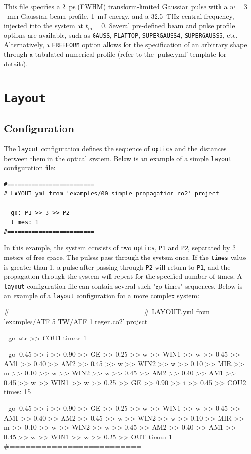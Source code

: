 This file specifies a 2~ps (FWHM) transform-limited Gaussian pulse with a $w=3$~mm Gaussian beam profile, 1~mJ energy, and a 32.5~THz central frequency, injected into the system at $t_{\text{in}}=0$. Several pre-defined beam and pulse profile options are available, such as \texttt{GAUSS}, \texttt{FLATTOP}, \texttt{SUPERGAUSS4}, \texttt{SUPERGAUSS6}, etc. Alternatively, a \texttt{FREEFORM} option allows for the specification of an arbitrary shape through a tabulated numerical profile (refer to the 'pulse.yml' template for details).


\section{\texttt{Layout}}
\subsection{Configuration}
The \texttt{layout} configuration defines the sequence of \texttt{optics} and the distances between them in the optical system. Below is an example of a simple \texttt{layout} configuration file:

\begin{verbatim}
#=========================
# LAYOUT.yml from 'examples/00 simple propagation.co2' project

- go: P1 >> 3 >> P2
  times: 1
#=========================
\end{verbatim}

In this example, the system consists of two \texttt{optics}, \texttt{P1} and \texttt{P2}, separated by 3 meters of free space. The pulses pass through the system once. If the \texttt{times} value is greater than 1, a pulse after passing through \texttt{P2} will return to \texttt{P1}, and the propagation through the system will repeat for the specified number of times. A \texttt{layout} configuration file can contain several such "go-times" sequences. Below is an example of a \texttt{layout} configuration for a more complex system:

\begin{spverbatim}
#=========================
# LAYOUT.yml from 'examples/ATF 5 TW/ATF 1 regen.co2' project

- go: str >> COU1
  times: 1

- go: 0.45 >> i >> 0.90 >> GE >> 0.25 >> w >> WIN1 >> w >> 0.45 >> AM1 >> 0.40 >> AM2 >> 0.45 >> w >> WIN2 >> w >> 0.10 >> MIR >> m >> 0.10 >> w >> WIN2 >> w >> 0.45 >> AM2 >> 0.40 >> AM1 >> 0.45 >> w >> WIN1 >> w >> 0.25 >> GE >> 0.90 >> i >> 0.45 >> COU2
  times: 15

- go: 0.45 >> i >> 0.90 >> GE >> 0.25 >> w >> WIN1 >> w >> 0.45 >> AM1 >> 0.40 >> AM2 >> 0.45 >> w >> WIN2 >> w >> 0.10 >> MIR >> m >> 0.10 >> w >> WIN2 >> w >> 0.45 >> AM2 >> 0.40 >> AM1 >> 0.45 >> w >> WIN1 >> w >> 0.25 >> OUT
  times: 1
#=========================
\end{spverbatim}


